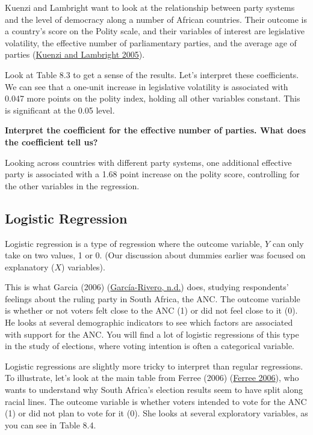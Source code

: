 \documentclass{book}
\newenvironment{shaded*}{
    \begin{center}
    \begin{tabular}{|p{0.9\textwidth}|}
    \hline\\
    }
    { 
    \\\\\hline
    \end{tabular} 
    \end{center}
}
\begin{document}
Kuenzi and Lambright want to look at the relationship between party systems
and the level of democracy along a number of African countries. Their outcome
is a country's score on the Polity scale, and their variables of interest are
legislative volatility, the effective number of parliamentary parties, and the
average age of parties
(\protect\hyperlink{ref-kuenziPartySystemsDemocratic2005}{Kuenzi and Lambright
2005}).

Look at Table 8.3 to get a sense of the results. Let's interpret these
coefficients. We can see that a one-unit increase in legislative volatility is
associated with 0.047 more points on the polity index, holding all other
variables constant. This is significant at the 0.05 level.

\textbf{Interpret the coefficient for the effective number of parties. What does the coefficient tell us?}

\begin{shaded*}

Looking across countries with different party systems, one additional
effective party is associated with a 1.68 point increase on the polity score,
controlling for the other variables in the regression.

\end{shaded*}

\hypertarget{logistic-regression}{%
\subsection{Logistic Regression}\label{logistic-regression}}

Logistic regression is a type of regression where the outcome variable, \(Y\)
can only take on two values, 1 or 0. (Our discussion about dummies earlier was
focused on explanatory (\(X\)) variables).

This is what Garcia (2006)
(\protect\hyperlink{ref-garcia-riveroRaceClassUnderlying2006}{García-Rivero,
n.d.}) does, studying respondents' feelings about the ruling party in South
Africa, the ANC. The outcome variable is whether or not voters felt close to
the ANC (1) or did not feel close to it (0). He looks at several demographic
indicators to see which factors are associated with support for the ANC. You
will find a lot of logistic regressions of this type in the study of
elections, where voting intention is often a categorical variable.

Logistic regressions are slightly more tricky to interpret than regular
regressions. To illustrate, let's look at the main table from Ferree (2006)
(\protect\hyperlink{ref-ferreeExplainingSouthAfrica2006}{Ferree 2006}), who
wants to understand why South Africa's election results seem to have split
along racial lines. The outcome variable is whether voters intended to vote
for the ANC (1) or did not plan to vote for it (0). She looks at several
exploratory variables, as you can see in Table 8.4.
\end{document}
